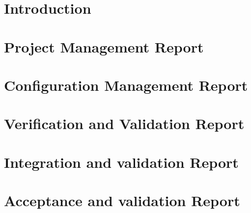 \documentclass[a4paper,twoside,openright,makeidx,12pt]{book}
\begin{document}
\pagestyle{empty}
\renewcommand{\arraystretch}{1.8}



\tableofcontents


\pagestyle{fancy}
\cleardoublepage

\chapter{Introduction}
\label{Sec:QR-Intoduction}


\newpage
\chapter{Project Management Report}
\label{Sec:QR-PMR}


\newpage
\chapter{Configuration Management Report}
\label{Sec:QR-CMR}


\newpage
\chapter{Verification and Validation Report}
\label{Sec:QR-VVR}


\chapter{Integration and validation Report}
\label{Sec:QR-RIT}


%

\chapter{Acceptance and validation Report}
\label{Sec:QR-ATR}

\end{document}
